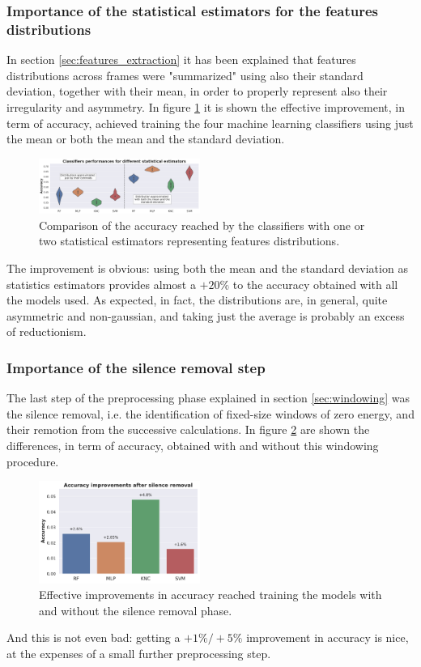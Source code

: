 \subsubsection{Importance of the statistical estimators for the features distributions}
\label{app:stat_estimators}
In section \ref{sec:features_extraction} it has been explained that features distributions across frames were "summarized" using also their standard deviation, together with their mean, in order to properly represent also their irregularity and asymmetry. In figure \ref{fig:stat_estimators} it is shown the effective improvement, in term of accuracy, achieved training the four machine learning classifiers using just the mean or both the mean and the standard deviation.
\begin{figure}[!h]
	\centering
	\includegraphics[width=0.47\textwidth]{pictures/stat_estimators.pdf}
	\caption{Comparison of the accuracy reached by the classifiers with one or two statistical estimators representing features distributions.}
	\label{fig:stat_estimators}
\end{figure}
The improvement is obvious: using both the mean and the standard deviation as statistics estimators provides almost a $+20\%$ to the accuracy obtained with all the models used. As expected, in fact, the distributions are, in general, quite asymmetric and non-gaussian, and taking just the average is probably an excess of reductionism.


\subsubsection{Importance of the silence removal step}
\label{app:importance_windowing}
The last step of the preprocessing phase explained in section \ref{sec:windowing} was the silence removal, i.e. the identification of fixed-size windows of zero energy, and their remotion from the successive calculations. In figure 	\ref{fig:silence_removal} are shown the differences, in term of accuracy, obtained with and without this windowing procedure.
\begin{figure}[!t]
	\centering
	\includegraphics[width=0.47\textwidth]{pictures/silence_removal.pdf}
	\caption{Effective improvements in accuracy reached training the models with and without the silence removal phase.}
	\label{fig:silence_removal}
\end{figure}
And this is not even bad: getting a $+1\%/+5\%$ improvement in accuracy is nice, at the expenses of a small further preprocessing step.

